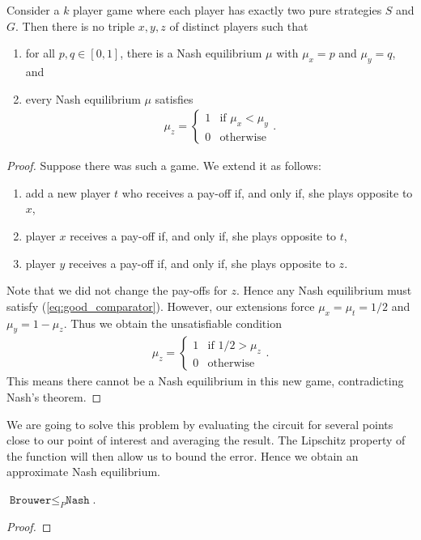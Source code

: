 \documentclass{article}
\begin{document}
\begin{lemma}
  Consider a $k$ player game where each player has exactly
  two pure strategies $S$ and $G$. Then there is no triple $x,y,z$ of
  distinct players such that
  \begin{enumerate}
    \item for all $p,q\in[0,1]$, there is a Nash equilibrium
      $\mu$ with $\mu_x = p$ and $\mu_y = q$, and
    \item every Nash equilibrium $\mu$ satisfies
      \begin{align}\label{eq:good_comparator}
        \mu_z = \begin{cases}
          1 & \text{if }\mu_x < \mu_y \\
          0 & \text{otherwise}
        \end{cases}.
      \end{align}
  \end{enumerate}
  \begin{proof}
    Suppose there was such a game. We extend it as follows:
    \begin{enumerate}
      \item add a new player $t$ who receives a pay-off if, and only if,
        she plays opposite to $x$,
      \item player $x$ receives a pay-off if, and only if, she plays
        opposite to $t$,
      \item player $y$ receives a pay-off if, and only if, she plays
        opposite to $z$.
    \end{enumerate}
    Note that we did not change the pay-offs for $z$. Hence any
    Nash equilibrium must satisfy (\ref{eq:good_comparator}).
    However, our extensions force $\mu_x = \mu_t = 1/2$
    and $\mu_y = 1-\mu_z$. Thus we obtain the unsatisfiable condition
    \begin{align*}
      \mu_z = \begin{cases}
        1 & \text{if }1/2 > \mu_z \\
        0 & \text{otherwise}
      \end{cases}.
    \end{align*}
    This means there cannot be a Nash equilibrium in this new game,
    contradicting Nash's theorem.
  \end{proof}
\end{lemma}

We are going to solve this problem by evaluating the circuit
for several points close to our point of interest and averaging the
result. The Lipschitz property of the function will then allow
us to bound the error. Hence we obtain an approximate Nash equilibrium.

\begin{theorem}
  $\texttt{Brouwer}\leq_P\texttt{Nash}$.
  \begin{proof}
    \missingproof
  \end{proof}
\end{theorem}

\printbibliography
\end{document}
